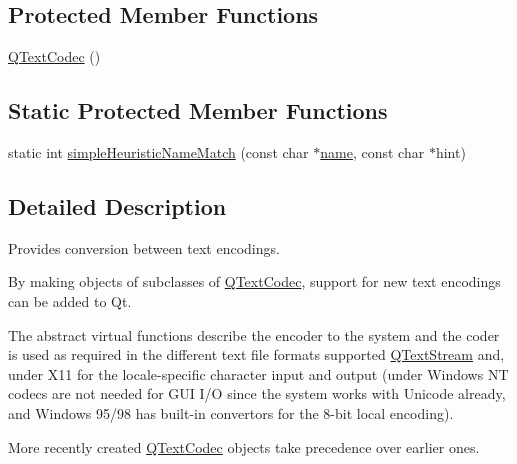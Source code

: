 \subsection*{Protected Member Functions}
\begin{DoxyCompactItemize}
\item 
\mbox{\hyperlink{class_q_text_codec_a237562a5481646e6f1c7656a1156719f}{Q\+Text\+Codec}} ()
\end{DoxyCompactItemize}
\subsection*{Static Protected Member Functions}
\begin{DoxyCompactItemize}
\item 
static int \mbox{\hyperlink{class_q_text_codec_a16459bb8c9e7c502547f45e5387fbb03}{simple\+Heuristic\+Name\+Match}} (const char $\ast$\mbox{\hyperlink{class_q_text_codec_a5b735ce19dc6b0fb0e8858bd3f54f0e2}{name}}, const char $\ast$hint)
\end{DoxyCompactItemize}


\subsection{Detailed Description}
Provides conversion between text encodings. 

By making objects of subclasses of \mbox{\hyperlink{class_q_text_codec}{Q\+Text\+Codec}}, support for new text encodings can be added to Qt.

The abstract virtual functions describe the encoder to the system and the coder is used as required in the different text file formats supported \mbox{\hyperlink{class_q_text_stream}{Q\+Text\+Stream}} and, under X11 for the locale-\/specific character input and output (under Windows NT codecs are not needed for G\+UI I/O since the system works with Unicode already, and Windows 95/98 has built-\/in convertors for the 8-\/bit local encoding).

More recently created \mbox{\hyperlink{class_q_text_codec}{Q\+Text\+Codec}} objects take precedence over earlier ones.

